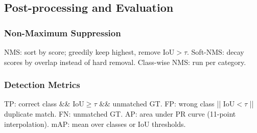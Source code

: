 \subsection{Post-processing and Evaluation}
\subsubsection*{Non-Maximum Suppression}
NMS: sort by score; greedily keep highest, remove IoU$>\tau$. Soft-NMS: decay scores by overlap instead of hard removal. Class-wise NMS: run per category.

\subsubsection*{Detection Metrics}
TP: correct class \&\& IoU$\ge\tau$ \&\& unmatched GT. FP: wrong class || IoU$<\tau$ || duplicate match. FN: unmatched GT.
AP: area under PR curve (11-point interpolation). mAP: mean over classes or IoU thresholds.

